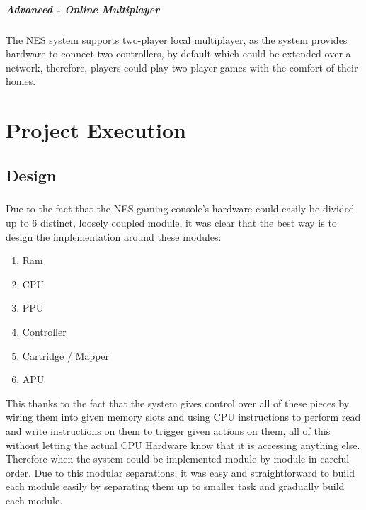 \documentclass[]{report}
\begin{document}
\paragraph{Advanced - Online Multiplayer}
The NES system supports two-player local multiplayer, as the system provides hardware to connect two controllers, by default which could be extended over a network, therefore, players could play two player games with the comfort of their homes.

\chapter{Project Execution}

\section{Design}

\paragraph{ }
Due to the fact that the NES gaming console's hardware could easily be divided up to 6 distinct, loosely coupled module, it was clear that the best way is to design the implementation around these modules:
\begin{enumerate}
	\item Ram
	\item CPU
	\item PPU
	\item Controller
	\item Cartridge / Mapper
	\item APU
\end{enumerate}

This thanks to the fact that the system gives control over all of these pieces by wiring them into given memory slots and using CPU instructions to perform read and write instructions on them to trigger given actions on them, all of this without letting the actual CPU Hardware know that it is accessing anything else. Therefore when the system could be implemented module by module in careful order. Due to this modular separations, it was easy and straightforward to build each module easily by separating them up to smaller task and gradually build each module.
\end{document}
